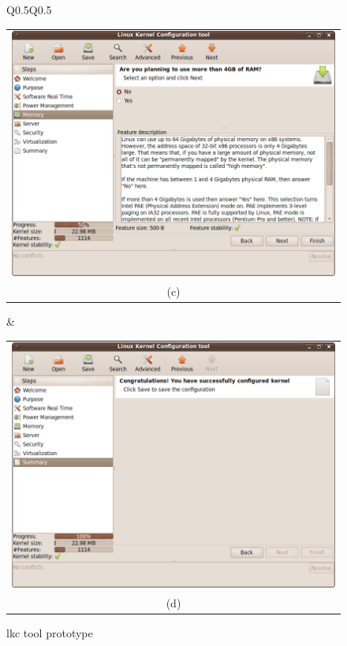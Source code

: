 \documentclass{chi2009}
\begin{document}
\begin{figure}[!t]
\begin{tabular}{Q{0.5\textwidth}Q{0.5\textwidth}}
 \begin{tabular}{c}
  \includegraphics[scale=0.25,keepaspectratio=true]{figs/lkc-final3} \\
  (c) \\
 \end{tabular}
  & 
\begin{tabular}{c}
  \includegraphics[scale=0.25,keepaspectratio=true]{figs/lkc-final4} \\
  (d) \\
 \end{tabular}
\end{tabular}
\caption{\textsf{lkc} tool prototype}
\label{fig:lkc-final}
\end{figure}
\end{document}
